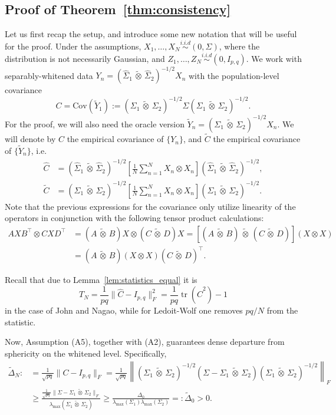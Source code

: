 \documentclass[12pt]{article}
\newcommand{\cov}{\mathrm{Cov}}
\newcommand{\tr}{\operatorname{tr}}
\newcommand{\ot}{\,\tilde\otimes\,}
\begin{document}
\subsection{Proof of Theorem~\ref{thm:consistency}}

Let us first recap the setup, and introduce some new notation that will be useful for the proof. Under the assumptions, $X_1,\ldots,X_N \stackrel{i.i.d}{\sim}(0,\Sigma)$, where the distribution is not necessarily Gaussian, and $Z_1,\ldots,Z_N \stackrel{i.i.d}{\sim}(0,I_{p,q})$. We work with separably-whitened data $Y_n = (\widehat\Sigma_1 \ot \widehat\Sigma_2)^{-1/2} X_n$ with the population-level covariance
\[
C  = \cov(\widetilde{Y}_1) := (\Sigma_1 \ot \Sigma_2)^{-1/2} \Sigma (\Sigma_1 \ot \Sigma_2)^{-1/2}.
\]
For the proof, we will also need the oracle version $\widetilde Y_n = (\Sigma_1 \ot \Sigma_2)^{-1/2} X_n$. We will denote by $\widehat{C}$ the empirical covariance of $\{Y_n\}$, and $\widetilde{C}$ the empirical covariance of $\{\widetilde Y_n\}$, i.e.
\[
\begin{split}
   \widehat C &= (\widehat\Sigma_1 \ot \widehat\Sigma_2)^{-1/2}\left[ \frac{1}{N}\sum_{n=1}^N X_n \otimes X_n\right] (\widehat\Sigma_1 \ot \widehat\Sigma_2)^{-1/2},\\
   \widetilde C &= (\Sigma_1 \ot \Sigma_2)^{-1/2} \left[ \frac{1}{N}\sum_{n=1}^N X_n \otimes X_n\right] (\Sigma_1 \ot \Sigma_2)^{-1/2}.
\end{split}
\]
Note that the previous expressions for the covariance only utilize linearity of the operators in conjunction with the following tensor product calculations:
\[
\begin{split}
A X B^\top \otimes CXD^\top &= (A \ot B) X \otimes (C \ot D) X = [(A\ot B) \ot (C \ot D)](X \otimes X)\\
& = (A \ot B) (X \otimes X) (C \ot D)^\top.
\end{split}
\]

Recall that due to Lemma~\ref{lem:statistics_equal} it is
\[
T_N = \frac{1}{pq}\|\widehat{C} - I_{p,q}\|_F^2 = \frac{1}{pq} \tr(\widehat{C}^2) -1
\]
in the case of John and Nagao, while for Ledoit-Wolf one removes $pq/N$ from the statistic.

Now, Assumption (A5), together with (A2), guarantees dense departure from sphericity on the whitened level. Specifically,
\[
\begin{split}
\widetilde{\Delta}_N :&= \frac{1}{\sqrt{pq}} \| C - I_{p,q} \|_F = \frac{1}{\sqrt{pq}} \left\| (\Sigma_1 \ot \Sigma_2)^{-1/2} (\Sigma - \Sigma_1 \ot \Sigma_2) (\Sigma_1 \ot \Sigma_2)^{-1/2} \right\|_F\\
&\geq \frac{\frac{1}{\sqrt{pq}}\|\Sigma - \Sigma_1 \ot \Sigma_2 \|_F}{\lambda_{\max}(\Sigma_1 \ot \Sigma_2)} \geq \frac{\Delta_0}{\lambda_{\max}(\Sigma_1) \lambda_{\max}(\Sigma_2)} =: \widetilde{\Delta}_0 > 0.
\end{split}
\]
\end{document}
